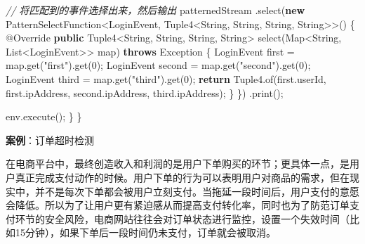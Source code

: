 \documentclass[cn,11pt,chinese]{elegantbook}
\newenvironment{Shaded}{}{}
\newcommand{\AttributeTok}[1]{\textcolor[rgb]{0.49,0.56,0.16}{#1}}
\newcommand{\BuiltInTok}[1]{#1}
\newcommand{\CommentTok}[1]{\textcolor[rgb]{0.38,0.63,0.69}{\textit{#1}}}
\newcommand{\DecValTok}[1]{\textcolor[rgb]{0.25,0.63,0.44}{#1}}
\newcommand{\FunctionTok}[1]{\textcolor[rgb]{0.02,0.16,0.49}{#1}}
\newcommand{\KeywordTok}[1]{\textcolor[rgb]{0.00,0.44,0.13}{\textbf{#1}}}
\newcommand{\NormalTok}[1]{#1}
\newcommand{\StringTok}[1]{\textcolor[rgb]{0.25,0.44,0.63}{#1}}
\begin{document}
\begin{Shaded}
\begin{Highlighting}[]
        \CommentTok{// 将匹配到的事件选择出来，然后输出}
\NormalTok{        patternedStream}
\NormalTok{            .}\FunctionTok{select}\NormalTok{(}\KeywordTok{new}\NormalTok{ PatternSelectFunction\textless{}LoginEvent, Tuple4\textless{}}\BuiltInTok{String}\NormalTok{, }\BuiltInTok{String}\NormalTok{, }\BuiltInTok{String}\NormalTok{, }\BuiltInTok{String}\NormalTok{\textgreater{}\textgreater{}() \{}
                \AttributeTok{@Override}
                \KeywordTok{public}\NormalTok{ Tuple4\textless{}}\BuiltInTok{String}\NormalTok{, }\BuiltInTok{String}\NormalTok{, }\BuiltInTok{String}\NormalTok{, }\BuiltInTok{String}\NormalTok{\textgreater{} }\FunctionTok{select}\NormalTok{(}\BuiltInTok{Map}\NormalTok{\textless{}}\BuiltInTok{String}\NormalTok{, }\BuiltInTok{List}\NormalTok{\textless{}LoginEvent\textgreater{}\textgreater{} map) }\KeywordTok{throws} \BuiltInTok{Exception}\NormalTok{ \{}
\NormalTok{                    LoginEvent first = map.}\FunctionTok{get}\NormalTok{(}\StringTok{"first"}\NormalTok{).}\FunctionTok{get}\NormalTok{(}\DecValTok{0}\NormalTok{);}
\NormalTok{                    LoginEvent second = map.}\FunctionTok{get}\NormalTok{(}\StringTok{"second"}\NormalTok{).}\FunctionTok{get}\NormalTok{(}\DecValTok{0}\NormalTok{);}
\NormalTok{                    LoginEvent third = map.}\FunctionTok{get}\NormalTok{(}\StringTok{"third"}\NormalTok{).}\FunctionTok{get}\NormalTok{(}\DecValTok{0}\NormalTok{);}
                    \KeywordTok{return}\NormalTok{ Tuple4.}\FunctionTok{of}\NormalTok{(first.}\FunctionTok{userId}\NormalTok{, first.}\FunctionTok{ipAddress}\NormalTok{, second.}\FunctionTok{ipAddress}\NormalTok{, third.}\FunctionTok{ipAddress}\NormalTok{);}
\NormalTok{                \}}
\NormalTok{            \})}
\NormalTok{            .}\FunctionTok{print}\NormalTok{();}
        
\NormalTok{        env.}\FunctionTok{execute}\NormalTok{();}
\NormalTok{    \}}
\NormalTok{\}}
\end{Highlighting}
\end{Shaded}

\textbf{案例}：订单超时检测

在电商平台中，最终创造收入和利润的是用户下单购买的环节；更具体一点，是用户真正完成支付动作的时候。用户下单的行为可以表明用户对商品的需求，但在现实中，并不是每次下单都会被用户立刻支付。当拖延一段时间后，用户支付的意愿会降低。所以为了让用户更有紧迫感从而提高支付转化率，同时也为了防范订单支付环节的安全风险，电商网站往往会对订单状态进行监控，设置一个失效时间（比如15分钟），如果下单后一段时间仍未支付，订单就会被取消。
\end{document}
